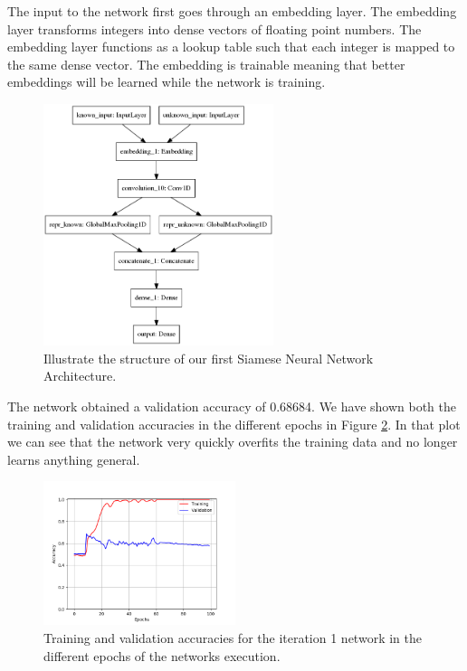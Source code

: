 The input to the network first goes through an embedding layer. The embedding
layer transforms integers into dense vectors of floating point numbers. The
embedding layer functions as a lookup table such that each integer is mapped
to the same dense vector. The embedding is trainable meaning that better
embeddings will be learned while the network is training.

\begin{figure}[htb]
    \centering
    \includegraphics[width=0.6\textwidth]{./pictures/experiments/network1.png}
    \caption{Illustrate the structure of our first Siamese Neural Network
        Architecture.}
    \label{fig:network_1}
\end{figure}

The network obtained a validation accuracy of 0.68684. We have shown both the
training and validation accuracies in the different epochs in Figure
\ref{fig:network1_accuracies}. In that plot we can see that the network very
quickly overfits the training data and no longer learns anything general.

\begin{figure}[htb]
    \centering
    \includegraphics[width=0.5\textwidth]{./pictures/experiments/network_1_accuracies.png}
    \caption{Training and validation accuracies for the iteration 1 network in
        the different epochs of the networks execution.}
    \label{fig:network1_accuracies}
\end{figure}


